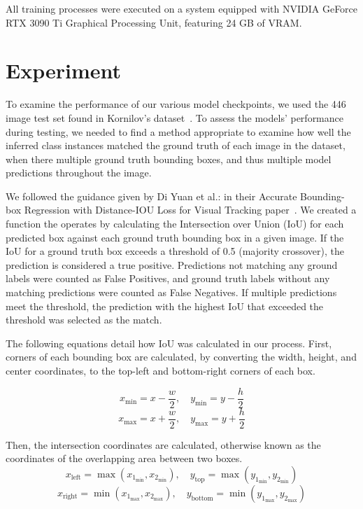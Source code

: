 \documentclass[10pt,twocolumn,letterpaper]{article}
\begin{document}
All training processes were executed on a system equipped with NVIDIA{\textregistered} GeForce{\textregistered} RTX 3090 Ti Graphical Processing Unit, featuring 24 GB of VRAM.

\section{Experiment}
To examine the performance of our various model checkpoints, we used the 446 image test set found in Kornilov's dataset~\cite{kornilov-dataset}. To assess the models' performance during testing, we needed to find a method appropriate to examine how well the inferred class instances matched the ground truth of each image in the dataset, when there multiple ground truth bounding boxes, and thus multiple model predictions throughout the image. 

We followed the guidance given by Di Yuan et al.: in their Accurate Bounding-box Regression with Distance-IOU Loss for Visual Tracking paper~\cite{accurate}. We created a function the operates by calculating the Intersection over Union (IoU) for each predicted box against each ground truth bounding box in a given image. If the IoU for a ground truth box exceeds a threshold of 0.5 (majority crossover), the prediction is considered a true positive. Predictions not matching any ground labels were counted as False Positives, and ground truth labels without any matching predictions were counted as False Negatives. If multiple predictions meet the threshold, the prediction with the highest IoU that exceeded the threshold was selected as the match.

The following equations detail how IoU was calculated in our process. First, corners of each bounding box are calculated, by converting the width, height, and center coordinates, to the top-left and bottom-right corners of each box.

\[
x_{\text{min}} = x - \frac{w}{2}, \quad y_{\text{min}} = y - \frac{h}{2}
\]
\[
x_{\text{max}} = x + \frac{w}{2}, \quad y_{\text{max}} = y + \frac{h}{2}
\]

Then, the intersection coordinates are calculated, otherwise known as the coordinates of the overlapping area between two boxes.
\[
x_{\text{left}} = \max(x_{1_{\text{min}}}, x_{2_{\text{min}}}), \quad y_{\text{top}} = \max(y_{1_{\text{min}}}, y_{2_{\text{min}}})
\]
\[
x_{\text{right}} = \min(x_{1_{\text{max}}}, x_{2_{\text{max}}}), \quad y_{\text{bottom}} = \min(y_{1_{\text{max}}}, y_{2_{\text{max}}})
\]
\end{document}
